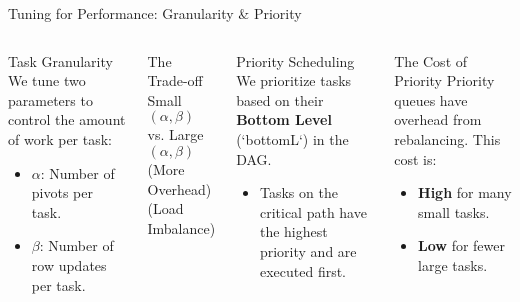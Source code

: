 \begin{frame}{Tuning for Performance: Granularity \& Priority}

	\begin{columns}[T,onlytextwidth]
	
	\pause 
	\begin{block}{Task Granularity}
	  We tune two parameters to control the amount of work per task:
	  \begin{itemize}
	    \item \textbf{$\alpha$}: Number of pivots per task.
	    \item \textbf{$\beta$}: Number of row updates per task.
	  \end{itemize}
	\end{block}
	
	\begin{alertblock}{The Trade-off}
	  \centering
	  \large
	  Small $(\alpha, \beta)$ \quad vs. \quad Large $(\alpha, \beta)$ \\
	  \small
	  (More Overhead) \quad (Load Imbalance)
	\end{alertblock}
	
	\pause 
	\begin{block}{Priority Scheduling}
	  We prioritize tasks based on their \textbf{Bottom Level} (`bottomL`) in the DAG.
	  \begin{itemize}
	    \item Tasks on the critical path have the highest priority and are executed first.
	  \end{itemize}
	\end{block}
	
	\begin{alertblock}{The Cost of Priority}
	  Priority queues have overhead from rebalancing. This cost is:
	  \begin{itemize}
	    \item \textbf{High} for many small tasks.
	    \item \textbf{Low} for fewer large tasks.
	  \end{itemize}
	\end{alertblock}
	
	\end{columns}
\end{frame}
